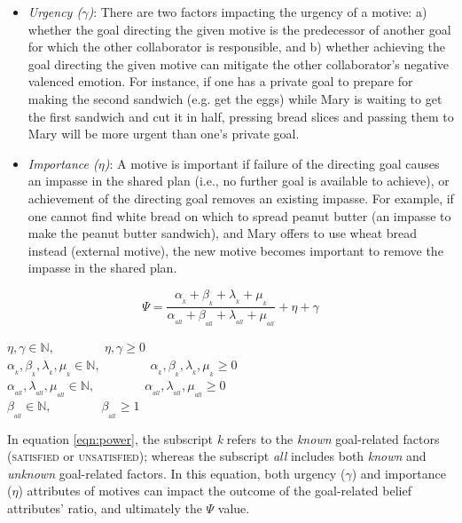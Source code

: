 \documentclass{article}
\begin{document}
\begin{itemize}[leftmargin=2pt]
  \setlength\itemsep{1mm}
  \item \textit{Urgency ($\gamma$)}: There are two factors impacting the urgency
  of a motive: a) whether the goal directing the given motive is the predecessor of
  another goal for which the other collaborator is responsible, and b) whether
  achieving the goal directing the given motive can mitigate the other
  collaborator's negative valenced emotion. For instance, if one has a private
  goal to prepare for making the second sandwich (e.g. get the eggs) while Mary
  is waiting to get the first sandwich and cut it in half, pressing bread slices
  and passing them to Mary will be more urgent than one's private goal.
  \item \textit{Importance ($\eta$)}: A motive is important if failure of the
  directing goal causes an impasse in the shared plan (i.e., no further goal is
  available to achieve), or achievement of the directing goal removes an
  existing impasse. For example, if one cannot find white bread on which to
  spread peanut butter (an impasse to make the peanut butter sandwich), and Mary
  offers to use wheat bread instead (external motive), the new motive becomes
  important to remove the impasse in the shared plan.
\end{itemize}

\vspace*{-4mm}
\begin{equation}
    \Psi = \frac{\alpha_{_k} + \beta_{_k} + \lambda_{_k} +
    \mu_{_k}}{\alpha_{_{all}} + \beta_{_{all}} + \lambda_{_{all}} +
    \mu_{_{all}}} + \eta + \gamma
    \label{eqn:power}
\end{equation}

\vspace*{1mm}
\begin{center} 
    $\eta, \gamma \in \mathbb{N}, \qquad\qquad \eta, \gamma \geq 0$\\
    $\alpha_{_k}, \beta_{_k}, \lambda_{_k}, \mu_{_k} \in \mathbb{N},
    \qquad\qquad \alpha_{_k}, \beta_{_k}, \lambda_{_k}, \mu_{_k} \geq 0$\\
    $\alpha_{_{all}}, \lambda_{_{all}}, \mu_{_{all}} \in \mathbb{N},
    \qquad\qquad \alpha_{_{all}}, \lambda_{_{all}}, \mu_{_{all}} \geq 0$\\
    $\beta_{_{all}} \in \mathbb{N}, \qquad\qquad \beta_{_{all}} \geq 1$
\end{center}

In equation \ref{eqn:power}, the subscript \textit{k} refers to the
\textit{known} goal-related factors (\textsc{satisfied} or
\textsc{unsatisfied}); whereas the subscript \textit{all} includes both
\textit{known} and \textit{unknown} goal-related factors. In this equation, both
urgency ($\gamma$) and importance ($\eta$) attributes of motives can impact the
outcome of the goal-related belief attributes' ratio, and ultimately the $\Psi$
value.
\end{document}
